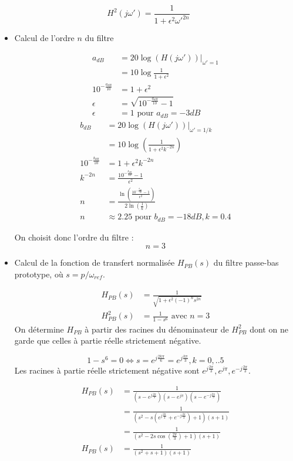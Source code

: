 \documentclass[../../Cours_M1.tex]{subfiles}
\begin{document}
\[\boxed{H^2(j\omega') = \frac{1}{1+\epsilon^2\omega'^{2n}}}\]
\begin{itemize}
\item Calcul de l'ordre $n$ du filtre
\begin{multicols}{2}
\begin{align*}
a_{dB} & = 20 \log(H(j\omega'))|_{\omega'=1} \\
& = 10 \log \frac{1}{1+\epsilon^2} \\
10^{-\frac{a_{dB}}{10}} & = 1 + \epsilon^2 \\
\epsilon & = \sqrt{10^{-\frac{a_{dB}}{10}}-1} \\
\epsilon & = 1 \text{ pour } a_{dB} = -3 dB
\end{align*}
\begin{align*}
b_{dB} & = 20 \log(H(j\omega'))|_{\omega'=1/k} \\
& = 10 \log (\frac{1}{1+\epsilon^2k^{-2n}})\\
10^{-\frac{b_{dB}}{10}} & = 1 + \epsilon^2 k^{-2n} \\
k^{-2n} & = \frac{10^{-\frac{b_{dB}}{10}}-1}{\epsilon^2} \\
n & = \frac{\ln (\frac{10^{-\frac{b_{dB}}{10}}-1}{\epsilon^2})}{2\ln(\frac{1}{k})} \\
n & \approx 2.25 \text{ pour } b_{dB} = -18dB, k = 0.4
\end{align*}
\end{multicols}
On choisit donc l'ordre du filtre : 
\[ n=3 \]

\item Calcul de la fonction de transfert normalisée $H_{PB}(s)$ du filtre passe-bas prototype, où $s = p/\omega_{ref}$.

\begin{align*}
H_{PB}(s) & = \frac{1}{\sqrt{1+\epsilon^2(-1)^ns^{2n}}} \\
H_{PB}^2(s) & = \frac{1}{1-s^6} \text{ avec } n=3
\end{align*}
On détermine $H_{PB}$ à partir des racines du dénominateur de $H_{PB}^2$ dont on ne garde que celles à partie réelle strictement négative.

\[1-s^6 = 0 \Leftrightarrow s = e^{j\frac{2k\pi}{6}} = e^{j\frac{k\pi}{3}}, k=0,..5 \]
Les racines à partie réelle strictement négative sont $e^{j\frac{2\pi}{3}}, e^{j\pi}, e^{-j\frac{2\pi}{3}}$.

\begin{align*}
H_{PB}(s) & = \frac{1}{(s-e^{j\frac{2\pi}{3}})(s-e^{j\pi})(s-e^{-j\frac{2\pi}{3}})} \\
& = \frac{1}{(s^2-s(e^{j\frac{2\pi}{3}}+e^{-j\frac{2\pi}{3}})+1)(s+1)} \\
& = \frac{1}{(s^2-2s\cos(\frac{2\pi}{3})+1)(s+1)} \\
H_{PB}(s) & = \frac{1}{(s^2+s+1)(s+1)}
\end{align*}


\end{itemize}
\end{document}
